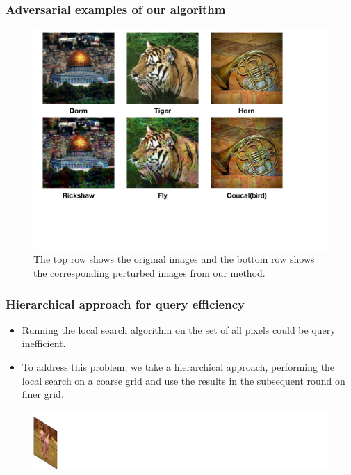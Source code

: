 \documentclass[10pt,mathserif]{beamer}
\begin{document}
\begin{frame}
\frametitle{Adversarial examples of our algorithm}
\begin{figure}
\centering
\includegraphics[scale=0.30]{figures/adv_image_examples.pdf}
\caption{The top row shows the original images and the bottom row shows the corresponding perturbed images from our method.}
\label{fig:adv_image_examples}
\end{figure}
\end{frame}

\begin{frame}
    \frametitle{Hierarchical approach for query efficiency}
    \begin{itemize}\itemsep=12pt
        \item Running the local search algorithm on the set of all pixels could be query inefficient.\pause
        \item To address this problem, we take a hierarchical approach, performing the local search on a coarse grid and use the results in the subsequent round on finer grid.
    \end{itemize}\pause
    \begin{figure}
        \centering
        \hspace*{-2.5em}
        \includegraphics[scale=0.35]{figures/hierarchical_1.png}
    \end{figure}
\end{frame}
\end{document}
